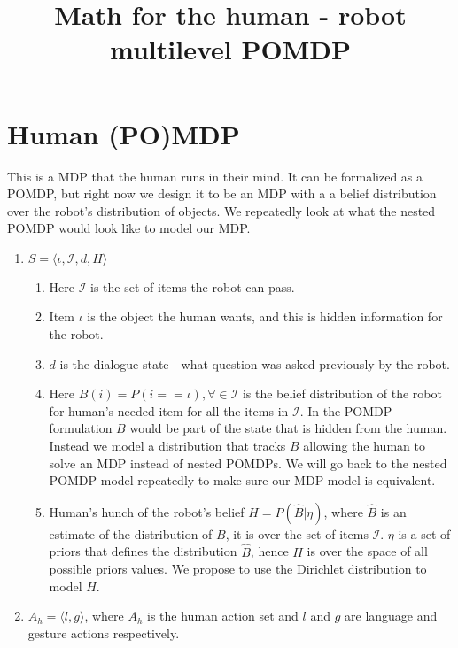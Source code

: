 \documentclass{article}
\title{Math for the human - robot multilevel POMDP}
\date{}
\begin{document}
\maketitle
\section{Human (PO)MDP}
This is a MDP that the human runs in their mind. It can be formalized as a POMDP, but right now we design it to be an MDP with a a belief distribution over the robot's distribution of objects. We repeatedly look at what the nested POMDP would look like to model our MDP.




\begin{enumerate}

	\item $S = \langle \iota, \mathcal{I}, d, H \rangle$
	\begin{enumerate}
	\item Here $\mathcal{I}$ is the set of items the robot can pass. 
	\item Item $\iota$ is the object the human wants, and this is hidden information for the robot. 
	\item $d$ is the dialogue state - what question was asked previously by the robot.
	\item Here $B(i) = P(i == \iota), \forall \in \mathcal{I}$ is the belief distribution of the robot for human's needed item for all the items in $\mathcal{I}$. In the POMDP formulation $B$ would be part of the state that is hidden from the human. Instead we model a distribution that tracks $B$ allowing the human to solve an MDP instead of nested POMDPs. We will go back to the nested POMDP model repeatedly to make sure our MDP model is equivalent.
	
	\item Human's hunch of the robot's belief $H = P(\widehat{B}| \eta)$, where $\widehat{B}$ is an estimate of the distribution of $B$, it is over the set of items $\mathcal{I}$. $\eta$ is a set of priors that defines the distribution $\widehat{B}$, hence $H$ is over the space of all possible priors values. We propose to use the Dirichlet distribution to model $H$.  
	
	\end{enumerate}
	

	\item $A_h = \langle l,g \rangle$, where $A_h$ is the human action set and $l$ and $g$ are language and gesture actions respectively.
	

\end{enumerate}
\end{document}
